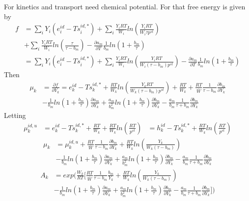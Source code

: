 \documentclass[11pt]{article}
\newcommand{\wbar}{\overline{W}}
\begin{document}
For kinetics and transport need chemical potential. For that free energy is given by
\begin{align}
f &= \sum_i Y_i (e_i^{id} - T s_i^{id,*}) +  \sum_i \frac{Y_i R T}{W_i} ln (\frac{Y_i R T}{W_i \tau p^{st}})  \nonumber \\
&+ \sum_i \frac{Y_i R T}{W_i} ln (\frac{\tau}{\tau-b_m}) - \frac{\partial a_m}{\partial T} \frac{1}{b_m}
ln (1+ \frac{b_m}{\tau})  \nonumber \\
 &= \sum_i Y_i (e_i^{id} - T s_i^{id,*}) +  \sum_i \frac{Y_i R T}{W_i} ln (\frac{Y_i R T}{W_i (\tau-b_m) p^{st}} )
- \frac{\partial a_m}{\partial T} \frac{1}{b_m}
ln (1+ \frac{b_m}{\tau})  \nonumber 
\end{align}
Then
\begin{align}
\mu_k &= \frac{\partial f}{\partial Y_k} = 
e_k^{id} - T s_k^{id,*}  + \frac{RT}{W_k} ln (\frac{Y_k R T}{W_k (\tau-b_m) p^{st}})
+ \frac{RT}{W_k} +  \frac{RT}{\wbar} \frac{1}{\tau-b_m} \frac {\partial b_m}{\partial Y_k} \nonumber \\
&- \frac{1}{b_m} ln(1 + \frac{b_m}{\tau}) \frac{\partial a_m}{\partial Y_k}
+ \frac{a_m}{b_m^2} ln(1 + \frac{b_m}{\tau}) \frac{\partial b_m}{\partial Y_k}
- \frac{a_m}{b_m} \frac{1}{\tau+b_m} \frac{\partial b_m}{\partial Y_k}
\end{align}
Letting
\begin{align}
\mu_k^{id,u} &=  e_k^{id} - T s_k^{id,*} + \frac{RT}{W_k}+ \frac{R T}{W_k} ln( \frac{RT}{p^{st}})
 &=  h_k^{id} - T s_k^{id,*} + \frac{R T}{W_k} ln( \frac{RT}{p^{st}})
\end{align}
\begin{align}
\mu_k &= \mu_k^{id,u} + \frac{RT}{\wbar} \frac{1}{\tau-b_m} \frac {\partial b_m}{\partial Y_k}
+ \frac {RT}{W_k} ln ( \frac{Y_k}{W_k (\tau-b_m)}) \nonumber \\
&- \frac{1}{b_m} ln(1 + \frac{b_m}{\tau}) \frac{\partial a_m}{\partial Y_k}
+ \frac{a_m}{b_m^2} ln(1 + \frac{b_m}{\tau}) \frac{\partial b_m}{\partial Y_k}
- \frac{a_m}{b_m} \frac{1}{\tau+b_m} \frac{\partial b_m}{\partial Y_k}
\end{align}
\begin{align}
A_k &=  exp  (  \frac{W_k}{RT}   [
\frac{RT}{\wbar} \frac{1}{\tau-b_m} \frac {b_m}{Y_k}
+ \frac {RT}{W_k} ln ( \frac{Y_k}{W_k (\tau-b_m)}) \nonumber \\
&- \frac{1}{b_m} ln(1 + \frac{b_m}{\tau}) \frac{\partial a_m}{\partial Y_k}
+ \frac{a_m}{b_m^2} ln(1 + \frac{b_m}{\tau}) \frac{\partial b_m}{\partial Y_k}
- \frac{a_m}{b_m} \frac{1}{\tau+b_m} \frac{\partial b_m}{\partial Y_k} ] )
\end{align}
\end{document}
